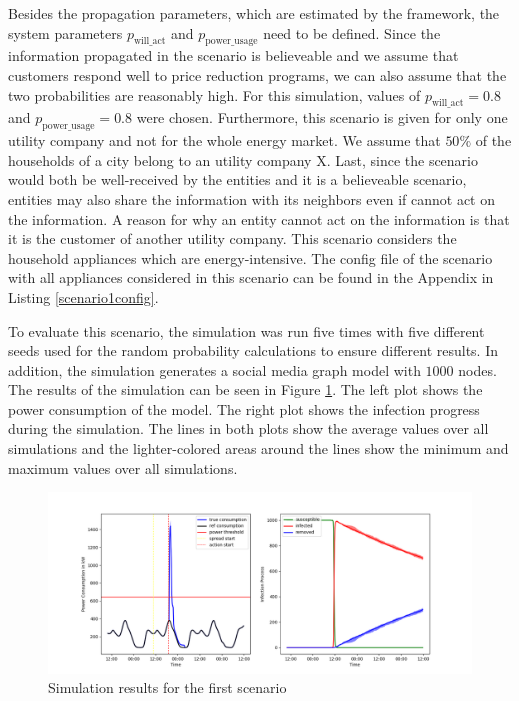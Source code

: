Besides the propagation parameters, which are estimated by the framework,
the system parameters $p_{\mathrm{will\_act}}$ and 
$p_{\mathrm{power\_usage}}$ need to be defined. Since the information 
propagated in the scenario
is believeable and we assume that customers respond well to price 
reduction programs, we can also assume that the two probabilities are 
reasonably high. For this simulation, values of $p_{\mathrm{will\_act}}=0.8$ and 
$p_{\mathrm{power\_usage}}=0.8$ were chosen. Furthermore, this scenario
is given for only one utility company and not for the whole 
energy market. We assume that $50\%$ of the households of a city belong
to an utility company X. Last, since the scenario would both be 
well-received by the entities and it is a believeable scenario, 
entities may also share the information with its neighbors even if
cannot act on the information. A reason for why an entity cannot act 
on the information is that it is the customer of another utility company.
This scenario considers the household appliances which are energy-intensive.
The config file of the scenario with all appliances considered in this
scenario can be found in the Appendix in Listing \ref{scenario1config}.


To evaluate this scenario, the simulation was run five times with five 
different seeds used for the random probability calculations to ensure
different results. In addition, the simulation generates a social media
graph model with $1000$ nodes. The results of the simulation 
can be seen in Figure \ref{firstscenariobasicresult}.
The left plot shows the power consumption of the model. The right 
plot shows the infection progress during the simulation.
The lines in both plots show the average values over all simulations and 
the lighter-colored areas around the lines show the minimum and maximum values
over all simulations. 


\begin{figure}[!ht]
    \center
    \includegraphics[scale=.53]{figs/eval/scenario1/basic_run.png}
    \caption{Simulation results for the first scenario}
    \label{firstscenariobasicresult}
\end{figure}

